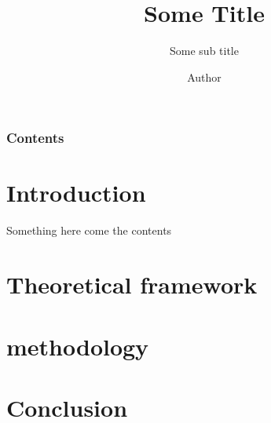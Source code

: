 \documentclass[10pt]{beamer}
\title[title for foot note]{Some Title}
\subtitle{Some sub title}
\author[Author for foot Note]{Author}
\institute[Institute in footnore]{Institute \\ Or some other details like supervisors}
\date[some date]
\newenvironment{tres important}[2][]{
	\setkeys{EmphEqEnv}{#2}
	\setkeys{EmphEqOpt}{box={\setlength{\fboxsep}{10pt}\fcolorbox{myNewColorA}{white}},#1}
	\EmphEqMainEnv}
{\endEmphEqMainEnv}
\begin{document}
        \begin{frame}
            \titlepage
        \end{frame}

        \begin{frame}
            \frametitle{Contents}
            \tableofcontents
        \end{frame}


    \section{Introduction}

        \begin{frame}{Something}
            here come the contents
        \end{frame}

    \section{Theoretical framework}

    \section{methodology}

    \section{Conclusion}
\end{document}
